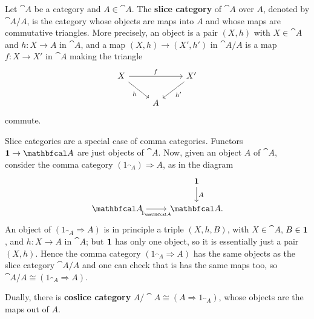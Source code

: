 \documentclass[11pt,a4paper]{article}
\begin{document}
\begin{example}
    Let $\cat{A}$ be a category and $A\in\cat{A}$. The \textbf{slice category} of $\cat{A}$ over $A$, denoted by $\cat{A}/A$, is the category whose objects are maps into $A$ and whose maps are commutative triangles. More precisely, an object is a pair $(X,h)$ with $X\in\cat{A}$ and $h:X\to A$ in $\cat{A}$, and a map $(X,h)\to (X',h')$ in $\cat{A}/A$ is a map $f: X\to X'$ in $\cat{A}$ making the triangle
    \begin{equation*}
    \begin{tikzcd}
        X \arrow[rr, "f"] \arrow[dr, "h"'] && X' \arrow[dl, "h'"] \\
        & A
    \end{tikzcd}
    \end{equation*}
    commute.
\end{example}
Slice categories are a special case of comma categories. Functors $\bcat{1}\to\cat{A}$ are just objects of $\cat{A}$. Now, given an object $A$ of $\cat{A}$, consider the comma category $(1_{\cat{A}})\Rightarrow A$, as in the diagram
    \begin{equation*}
    \begin{tikzcd}
        & \bcat{1} \arrow[d, "A"] \\
        \cat{A} \arrow[r, "1_{\cat{A}}"'] & \cat{A}.
    \end{tikzcd}
    \end{equation*}
    An object of $(1_{\cat{A}}\Rightarrow A)$ is in principle a triple $(X,h,B)$, with $X\in\cat{A}$, $B\in\mathbf{1}$, and $h:X\to A$ in $\cat{A}$; but $\mathbf{1}$ has only one object, so it is essentially just a pair $(X,h)$. Hence the comma category $(1_{\cat{A}}\Rightarrow A)$ has the same objects as the slice category $\cat{A}/A$ and one can check that is has the same maps too, so $\cat{A}/A\cong (1_{\cat{A}}\Rightarrow A)$.\par

    Dually, there is \textbf{coslice category} $A/\cat{A}\cong (A\Rightarrow 1_{\cat{A}})$, whose objects are the maps out of $A$.
\end{document}
